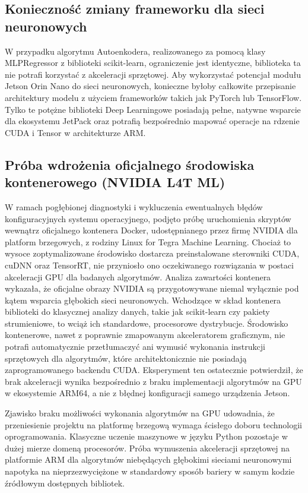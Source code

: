 \documentclass[12pt,twoside]{article}
\begin{document}
\subsection{Konieczność zmiany frameworku dla sieci neuronowych}
W przypadku algorytmu Autoenkodera, realizowanego za pomocą klasy MLPRegressor z biblioteki scikit-learn, ograniczenie jest identyczne, biblioteka ta nie potrafi korzystać z akceleracji sprzętowej. Aby wykorzystać potencjał modułu Jetson Orin Nano do sieci neuronowych, konieczne byłoby całkowite przepisanie architektury modelu z użyciem frameworków takich jak PyTorch lub TensorFlow. Tylko te potężne biblioteki Deep Learningowe posiadają pełne, natywne wsparcie dla ekosystemu JetPack oraz potrafią bezpośrednio mapować operacje na rdzenie CUDA i Tensor w architekturze ARM.
\subsection{Próba wdrożenia oficjalnego środowiska kontenerowego (NVIDIA L4T ML)}
W ramach pogłębionej diagnostyki i wykluczenia ewentualnych błędów konfiguracyjnych systemu operacyjnego, podjęto próbę uruchomienia skryptów wewnątrz oficjalnego kontenera Docker, udostępnianego przez firmę NVIDIA dla platform brzegowych, z rodziny Linux for Tegra Machine Learning. Chociaż to wysoce zoptymalizowane środowisko dostarcza preinstalowane sterowniki CUDA, cuDNN oraz TensorRT, nie przyniosło ono oczekiwanego rozwiązania w postaci akceleracji GPU dla badanych algorytmów. Analiza zawartości kontenera wykazała, że oficjalne obrazy NVIDIA są przygotowywane niemal wyłącznie pod kątem wsparcia głębokich sieci neuronowych. Wchodzące w skład kontenera biblioteki do klasycznej analizy danych, takie jak scikit-learn czy pakiety strumieniowe, to wciąż ich standardowe, procesorowe dystrybucje. Środowisko kontenerowe, nawet z poprawnie zmapowanym akceleratorem graficznym, nie potrafi automatycznie przetłumaczyć ani wymusić wykonania instrukcji sprzętowych dla algorytmów, które architektonicznie nie posiadają zaprogramowanego backendu CUDA. Eksperyment ten ostatecznie potwierdził, że brak akceleracji wynika bezpośrednio z braku implementacji algorytmów na GPU w ekosystemie ARM64, a nie z błędnej konfiguracji samego urządzenia Jetson.

Zjawisko braku możliwości wykonania algorytmów na GPU udowadnia, że przeniesienie projektu na platformę brzegową wymaga ścisłego doboru technologii oprogramowania. Klasyczne uczenie maszynowe w języku Python pozostaje w dużej mierze domeną procesorów. Próba wymuszenia akceleracji sprzętowej na platformie ARM dla algorytmów niebędących głębokimi sieciami neuronowymi napotyka na nieprzezwyciężone w standardowy sposób bariery w samym kodzie źródłowym dostępnych bibliotek.
\end{document}
